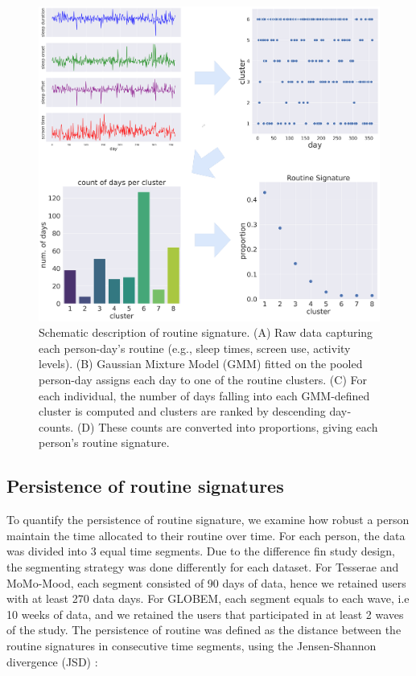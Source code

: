 \documentclass[pdflatex,sn-vancouver,Numbered]{bst/sn-jnl}%
\theoremstyle{thmstyleone}%
\theoremstyle{thmstyletwo}%
\theoremstyle{thmstylethree}%
\begin{document}
\begin{figure}[!htbp]
    \centering
    \includegraphics[width=\textwidth]{figures/digi-schema.png}
    \caption{Schematic description of routine signature. (A) Raw data capturing each person-day’s routine (e.g., sleep times, screen use, activity levels).
(B) Gaussian Mixture Model (GMM) fitted on the pooled person-day assigns each day to one of the routine clusters.
(C) For each individual, the number of days falling into each GMM‐defined cluster is computed and clusters are ranked by descending day‐counts.
(D) These counts are converted into proportions, giving each person’s routine signature.}
    \label{fig:routine-sig-workflow}
\end{figure}

\subsection*{Persistence of routine signatures}\label{sec:methods:signature_persistence}  

To quantify the persistence of routine signature, we examine how robust a person maintain the time allocated to their routine over time. For each person, the data was divided into 3 equal time segments. Due to the difference fin study design, the segmenting strategy was done differently for each dataset. For Tesserae and MoMo-Mood, each segment consisted of 90 days of data, hence we retained users with at least 270 data days. For GLOBEM, each segment equals to each wave, i.e 10 weeks of data, and we retained the users that participated in at least 2 waves of the study. The persistence of routine was defined as the distance between the routine signatures in consecutive time segments, using the Jensen-Shannon divergence (JSD) \cite{lin1991divergence}:
\end{document}
